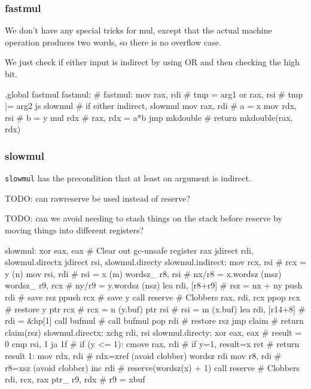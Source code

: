 \subsubsection{fastmul}

We don't have any special tricks for mul, except that the actual machine
operation produces two words, so there is no overflow case.

We just check if either input is indirect by using OR and then checking
the high bit.

\begin{asm}
.global fastmul
fastmul:                                    # fastmul:
	mov	rax, rdi                    #   tmp = arg1
	or	rax, rsi                    #   tmp |= arg2
	js	slowmul                     #   if either indirect, slowmul
	mov	rax, rdi                    #   a = x
	mov	rdx, rsi                    #   b = y
	mul	rdx                         #   rax, rdx = a*b
	jmp	mkdouble                    #   return mkdouble(rax, rdx)
\end{asm}

\subsubsection{slowmul}

\lstinline|slowmul| has the precondition that at least on argument
is indirect.

TODO: can rawreserve be used instead of reserve?

TODO: can we avoid needing to stash things on the stack before reserve
by moving things into different registers?

\begin{asm}
slowmul:
	xor	eax, eax                    # Clear out gc-unsafe register rax
	jdirect	rdi, slowmul.directx
	jdirect	rsi, slowmul.directy
slowmul.indirect:
	mov	rcx, rsi                    # rcx   = y (n)
	mov	rsi, rdi                    # rsi   = x (m)
	wordsz_	r8, rsi                     # nx/r8 = x.wordsz (msz)
	wordsz_	r9, rcx                     # ny/r9 = y.wordsz (nsz)
	lea	rdi, [r8+r9]                # rsz   = nx + ny
	push	rdi                         # save rsz
	ppush	rcx                         # save y
	call	reserve                     # Clobbers rax, rdi, rcx
	ppop	rcx                         # restore y
	ptr	rcx                         # rcx = n (y.buf)
	ptr	rsi                         # rsi = m (x.buf)
	lea	rdi, [r14+8]                # rdi = &hp[1]
	call	bufmul                      # call bufmul
	pop	rdi                         # restore rsz
	jmp	claim                       # return claim(rsz)
slowmul.directx:
	xchg	rdi, rsi
slowmul.directy:
	xor	eax, eax                    # result = 0
	cmp	rsi, 1
	ja	1f                          # if (y <= 1):
	cmove	rax, rdi                    #     if y=1, result=x
	ret                                 #     return result
1:	mov	rdx, rdi                    # rdx=xref (avoid clobber)
	wordsz	rdi
	mov	r8, rdi                     # r8=xsz   (avoid clobber)
	inc	rdi                         # reserve(wordsz(x) + 1)
	call	reserve                     # Clobbers rdi, rcx, rax
	ptr_	r9, rdx                     # r9 = xbuf
\end{asm}

